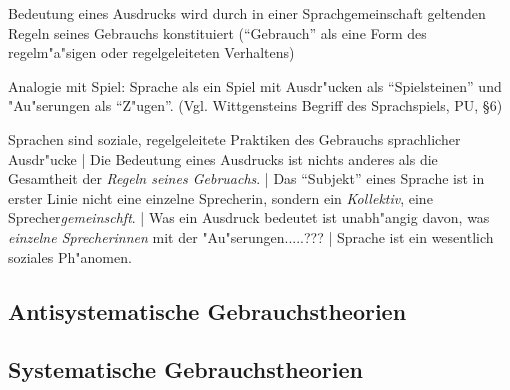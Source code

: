 \documentclass[emulatestandardclasses]{scrartcl}
\begin{document}
\begin{description}[leftmargin=!,labelwidth=\widthof{\bfseries Erl"auterung}]
    \item[Grundidee] Bedeutung eines Ausdrucks wird durch in einer Sprachgemeinschaft geltenden Regeln seines Gebrauchs konstituiert ("`Gebrauch"' als eine Form des regelm"a"sigen oder regelgeleiteten Verhaltens)
    \item[Erl"auterung] Analogie mit Spiel: Sprache als ein Spiel mit Ausdr"ucken als "`Spielsteinen"' und "Au"serungen als "`Z"ugen"'. (Vgl. Wittgensteins Begriff des Sprachspiels, PU, \S 6)
    \item[Folgerungen]Sprachen sind soziale, regelgeleitete Praktiken des Gebrauchs sprachlicher Ausdr"ucke | Die Bedeutung eines Ausdrucks ist nichts anderes als die Gesamtheit der \emph{Regeln seines Gebruachs}. | Das "`Subjekt"' eines Sprache ist in erster Linie nicht eine einzelne Sprecherin, sondern ein \emph{Kollektiv}, eine Sprecher\emph{gemeinschft}. | Was ein Ausdruck bedeutet ist unabh"angig davon, was \emph{einzelne Sprecherinnen} mit der "Au"serungen.....??? | Sprache ist ein wesentlich soziales Ph"anomen.
\end{description}

\subsection{Antisystematische Gebrauchstheorien}


\subsection{Systematische Gebrauchstheorien}

\newpage
%
%

\end{document}
